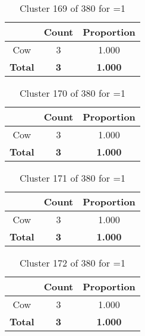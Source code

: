 \begin{table}[ht!]
\centering
\begin{tabular}{|c|c|c|}
\hline
\bf \Spec{} &\bf Count &\bf Proportion\\ \hline \hline
Cow & 3 & 1.000\\ \hline
\hline
\bf Total & \bf 3 & \bf 1.000\\ \hline
\end{tabular}
\label{tab:cluster:169:1}
\caption{Cluster 169 of 380 for \minneigh{}=1}
\end{table}

\clearpage
\begin{table}[ht!]
\centering
\begin{tabular}{|c|c|c|}
\hline
\bf \Spec{} &\bf Count &\bf Proportion\\ \hline \hline
Cow & 3 & 1.000\\ \hline
\hline
\bf Total & \bf 3 & \bf 1.000\\ \hline
\end{tabular}
\label{tab:cluster:170:1}
\caption{Cluster 170 of 380 for \minneigh{}=1}
\end{table}

\begin{table}[ht!]
\centering
\begin{tabular}{|c|c|c|}
\hline
\bf \Spec{} &\bf Count &\bf Proportion\\ \hline \hline
Cow & 3 & 1.000\\ \hline
\hline
\bf Total & \bf 3 & \bf 1.000\\ \hline
\end{tabular}
\label{tab:cluster:171:1}
\caption{Cluster 171 of 380 for \minneigh{}=1}
\end{table}

\begin{table}[ht!]
\centering
\begin{tabular}{|c|c|c|}
\hline
\bf \Spec{} &\bf Count &\bf Proportion\\ \hline \hline
Cow & 3 & 1.000\\ \hline
\hline
\bf Total & \bf 3 & \bf 1.000\\ \hline
\end{tabular}
\label{tab:cluster:172:1}
\caption{Cluster 172 of 380 for \minneigh{}=1}
\end{table}

